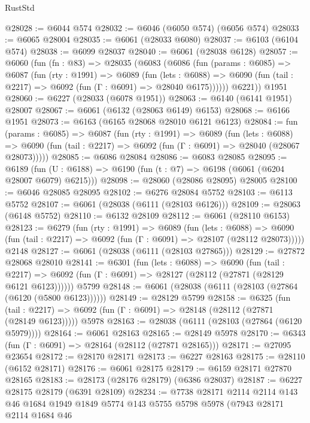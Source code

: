 \begin{lexlean}{RustStd}
\begin{coremodule}
@28028 := @6044 @574
@28032 := @6046 (@6050 @574) (@6056 @574)
@28033 := @6065 @28004
@28035 := @6061 (@28033 @6080)
@28037 := @6103 (@6104 @574)
@28038 := @6099 @28037
@28040 := @6061 (@28038 @6128)
@28057 := @6060
    (fun (fn : @83) =>
    @28035
      (@6083
        (@6086
          (fun (params : @6085) =>
          @6087
            (fun (rty : @1991) =>
            @6089
              (fun (lets : @6088) =>
              @6090 (fun (tail : @2217) => @6092 (fun (Γ : @6091) => @28040 @6175))))))
        @6221))
    @1951
@28060 := @6227 (@28033 (@6078 @1951))
@28063 := @6140 (@6141 @1951) @28007
@28067 := @6061 (@6132 (@28063 @6149) @6153)
@28068 := @6166 @1951
@28073 := @6163 (@6165 @28068 @28010 @6121 @6123)
@28084 := fun (params : @6085) =>
  @6087
    (fun (rty : @1991) =>
    @6089
      (fun (lets : @6088) =>
      @6090 (fun (tail : @2217) => @6092 (fun (Γ : @6091) => @28040 (@28067 @28073)))))
@28085 := @6086 @28084
@28086 := @6083 @28085
@28095 := @6189
    (fun (U : @6188) => @6190 (fun (t : @7) => @6198 (@6061 (@6204 @28007 @6079) @6215)))
@28098 := @28060 (@28086 @28095) @28005
@28100 := @6046 @28085 @28095
@28102 := @6276 @28084 @5752
@28103 := @6113 @5752
@28107 := @6061 (@28038 (@6111 (@28103 @6126)))
@28109 := @28063 (@6148 @5752)
@28110 := @6132 @28109
@28112 := @6061 (@28110 @6153)
@28123 := @6279
    (fun (rty : @1991) =>
    @6089
      (fun (lets : @6088) =>
      @6090 (fun (tail : @2217) => @6092 (fun (Γ : @6091) => @28107 (@28112 @28073)))))
    @2148
@28127 := @6061 (@28038 (@6111 (@28103 @27865)))
@28129 := @27872 @28068 @28010
@28141 := @6301
    (fun (lets : @6088) =>
    @6090
      (fun (tail : @2217) =>
      @6092 (fun (Γ : @6091) => @28127 (@28112 (@27871 (@28129 @6121 @6123))))))
    @5799
@28148 := @6061 (@28038 (@6111 (@28103 (@27864 (@6120 (@5800 @6123))))))
@28149 := @28129 @5799
@28158 := @6325
    (fun (tail : @2217) => @6092 (fun (Γ : @6091) => @28148 (@28112 (@27871 (@28149 @6123)))))
    @5978
@28163 := @28038 (@6111 (@28103 (@27864 (@6120 @5979))))
@28164 := @6061 @28163
@28165 := @28149 @5978
@28170 := @6343 (fun (Γ : @6091) => @28164 (@28112 (@27871 @28165)))
@28171 := @27095 @23654
@28172 := @28170 @28171
@28173 := @6227 @28163
@28175 := @28110 (@6152 @28171)
@28176 := @6061 @28175
@28179 := @6159 @28171 @27870 @28165
@28183 := @28173 (@28176 @28179) (@6386 @28037)
@28187 := @6227 @28175 @28179 (@6391 @28109)
@28234 := @7738
    @28171
    @2114
    @2114
    @143
    @46
    @1684
    @1949
    @1849
    @5774
    @143
    @5755
    @5798
    @5978
    (@7943
      @28171
      @2114
      @1684
      @46

\end{coremodule}
\end{lexlean}
